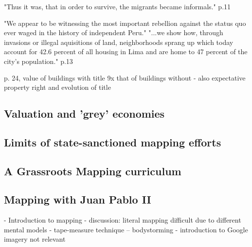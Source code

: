 \documentclass[11pt]{report}
\begin{document}

"Thus it was, that in order to survive, the migrants became informals." p.11

"We appear to be witnessing the most important rebellion against the status quo ever waged in the history of independent Peru."
"...we show how, through invasions or illegal aquisitions of land, neighborhoods sprang up which today account for 42.6 percent of all housing in Lima and are home to 47 percent of the city's population." p.13

p. 24, value of buildings with title 9x that of buildings without - also expectative property right and evolution of title

\subsection{Valuation and 'grey' economies}


\subsection{Limits of state-sanctioned mapping efforts}


\subsection{A Grassroots Mapping curriculum}


\subsection{Mapping with Juan Pablo II}

                - Introduction to mapping
                    - discussion: literal mapping difficult due to different mental models
                    - tape-measure technique -- bodystorming
                    - introduction to Google imagery not relevant
\end{document}
